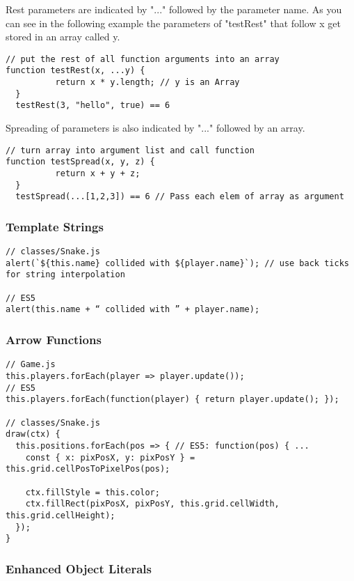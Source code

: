 \documentclass{bioinfo}
\begin{document}
Rest parameters are indicated by  "..." followed by the parameter name. As you can see in the following 
example the parameters of "testRest" that follow x get stored in an array called y.

\begin{lstlisting}[caption= My Javascript Example]
// put the rest of all function arguments into an array
function testRest(x, ...y) {
          return x * y.length; // y is an Array
  }
  testRest(3, "hello", true) == 6
\end{lstlisting}

Spreading of parameters is also indicated by "..." followed by an array. 
\begin{lstlisting}[caption= My Javascript Example]
// turn array into argument list and call function
function testSpread(x, y, z) {
          return x + y + z;
  }
  testSpread(...[1,2,3]) == 6 // Pass each elem of array as argument
\end{lstlisting}

\subsubsection{Template Strings}

\begin{lstlisting}[caption= My Javascript Example]
// classes/Snake.js
alert(`${this.name} collided with ${player.name}`); // use back ticks for string interpolation

// ES5
alert(this.name + “ collided with ” + player.name);
\end{lstlisting}

\subsubsection{Arrow Functions}

\begin{lstlisting}[caption= My Javascript Example]
// Game.js
this.players.forEach(player => player.update());
// ES5
this.players.forEach(function(player) { return player.update(); });

// classes/Snake.js
draw(ctx) {
  this.positions.forEach(pos => { // ES5: function(pos) { ...
    const { x: pixPosX, y: pixPosY } = this.grid.cellPosToPixelPos(pos);

    ctx.fillStyle = this.color;
    ctx.fillRect(pixPosX, pixPosY, this.grid.cellWidth, this.grid.cellHeight);
  });
}
\end{lstlisting}

\subsubsection{Enhanced Object Literals}
\end{document}
